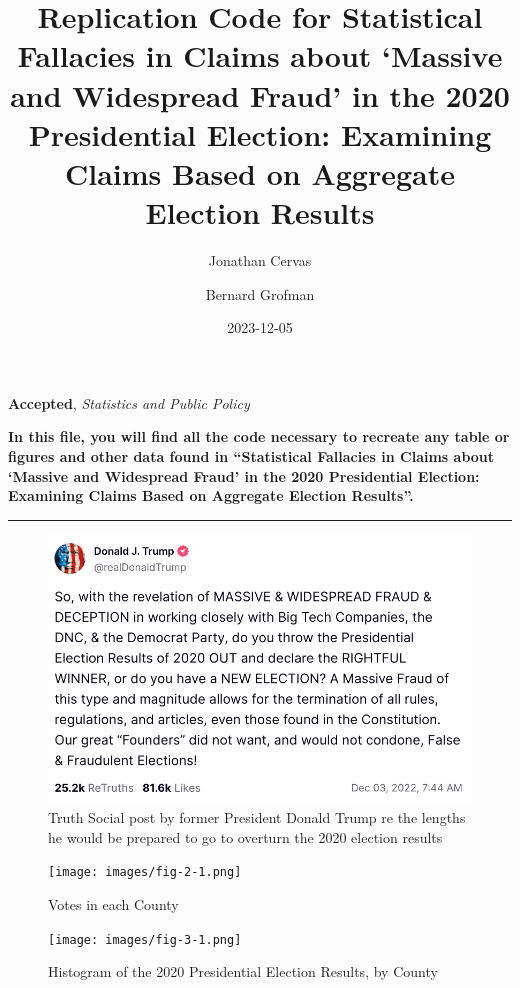 \documentclass[
]{article}
\title{Replication Code for Statistical Fallacies in Claims about
`Massive and Widespread Fraud' in the 2020 Presidential Election:
Examining Claims Based on Aggregate Election Results}
\author{Jonathan Cervas \and Bernard Grofman}
\date{2023-12-05}
\begin{document}
\maketitle

\textbf{Accepted}, \emph{Statistics and Public Policy}

\textbf{In this file, you will find all the code necessary to recreate
any table or figures and other data found in ``Statistical Fallacies in
Claims about `Massive and Widespread Fraud' in the 2020 Presidential
Election: Examining Claims Based on Aggregate Election Results''.}

\begin{center}\rule{0.5\linewidth}{0.5pt}\end{center}

\begin{figure}
\includegraphics[width=1\linewidth]{images/fig-1-1} \caption{Truth Social post by former President Donald Trump re the lengths he would be prepared to go to overturn the 2020 election results}\label{fig:fig-1}
\end{figure}

\begin{figure}
\centering
\texttt{[image: images/fig-2-1.png]}
\caption{Votes in each County}
\end{figure}

\begin{figure}
\centering
\texttt{[image: images/fig-3-1.png]}
\caption{Histogram of the 2020 Presidential Election Results, by County}
\end{figure}
\end{document}
